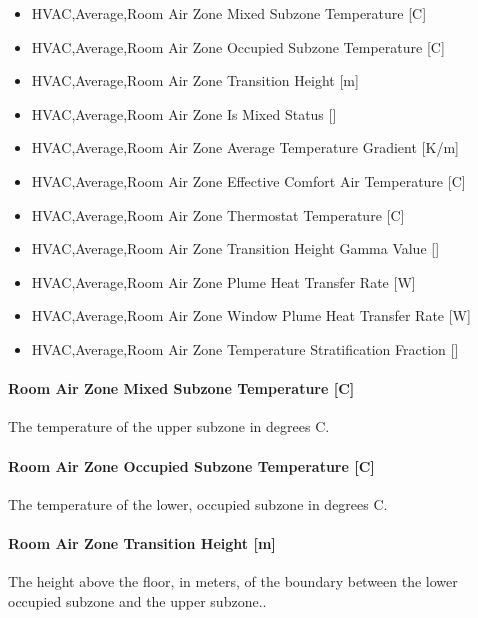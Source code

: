 \begin{itemize}
\item
  HVAC,Average,Room Air Zone Mixed Subzone Temperature {[}C{]}
\item
  HVAC,Average,Room Air Zone Occupied Subzone Temperature {[}C{]}
\item
  HVAC,Average,Room Air Zone Transition Height {[}m{]}
\item
  HVAC,Average,Room Air Zone Is Mixed Status {[]}
\item
  HVAC,Average,Room Air Zone Average Temperature Gradient {[}K/m{]}
\item
  HVAC,Average,Room Air Zone Effective Comfort Air Temperature {[}C{]}
\item
  HVAC,Average,Room Air Zone Thermostat Temperature {[}C{]}
\item
  HVAC,Average,Room Air Zone Transition Height Gamma Value {[]}
\item
  HVAC,Average,Room Air Zone Plume Heat Transfer Rate {[}W{]}
\item
  HVAC,Average,Room Air Zone Window Plume Heat Transfer Rate {[}W{]}
\item
  HVAC,Average,Room Air Zone Temperature Stratification Fraction {[]}
\end{itemize}

\paragraph{Room Air Zone Mixed Subzone Temperature {[}C{]}}\label{room-air-zone-mixed-subzone-temperature-c-1-2}

The temperature of the upper subzone in degrees C.

\paragraph{Room Air Zone Occupied Subzone Temperature {[}C{]}}\label{room-air-zone-occupied-subzone-temperature-c-1-2}

The temperature of the lower, occupied subzone in degrees C.

\paragraph{Room Air Zone Transition Height {[}m{]}}\label{room-air-zone-transition-height-m-1-2}

The height above the floor, in meters, of the boundary between the lower occupied subzone and the upper subzone..

